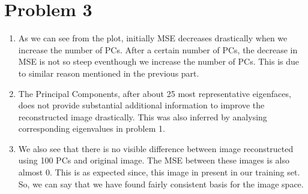 \documentclass[11pt,letterpaper]{article}
\begin{document}
\section*{Problem 3}
\begin{figure}[htbp]
    \centering
    \end{figure}
\begin{enumerate}
    [label=$\bullet$]
    \item As we can see from the plot, initially MSE decreases drastically when we increase the number of PCs. After a certain number of PCs, the decrease in MSE is not so steep eventhough we increase the number of PCs. This is due to similar reason mentioned in the previous part. 
    \item The Principal Components, after about 25 most representative eigenfaces, does not provide substantial additional information to improve the reconstructed image drastically. This was also inferred by analysing corresponding eigenvalues in problem 1. 
    \item We also see that there is no visible difference between image reconstructed using 100 PCs and original image. The MSE between these images is also almost 0. This is as expected since, this image in present in our training set. So, we can say that we have found fairly consistent basis for the image space.
\end{enumerate}
\begin{figure}[htbp]
    \centering
     \\
    \end{figure}
\end{document}
